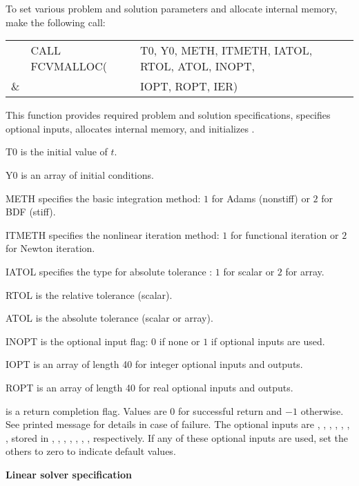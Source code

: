 \begin{Steps}
  To set various problem and solution parameters and allocate
  internal memory, make the following call:
  {
    \begin{tabular}[t]{@{}r@{}l@{}l@{}}
      &CALL FCVMALLOC(&T0, Y0, METH, ITMETH, IATOL, RTOL, ATOL, INOPT, \\
    \&&               &IOPT, ROPT, IER)
    \end{tabular}
  }
  {
    This function provides required problem and solution specifications, 
    specifies optional inputs,
    allocates internal memory, and initializes {\cvode}.
  }
  {
    \begin{args}[ITMETH ]
    \item[T0] is the initial value of $t$.
    \item[Y0] is an array of initial conditions.
    \item[METH] specifies the  basic integration method: 
      $1$ for Adams (nonstiff) or $2$ for BDF (stiff).
    \item[ITMETH] specifies the nonlinear iteration method: 
      $1$ for functional iteration or $2$ for Newton iteration.
    \item[IATOL] specifies the type for absolute tolerance :
      $1$ for scalar or $2$ for array.
    \item[RTOL] is the relative tolerance (scalar).
    \item[ATOL] is the absolute tolerance (scalar or array).
    \item[INOPT] is the optional input flag: $0$ if none or $1$ if optional 
      inputs are used.
    \item[IOPT] is an array of length 40 for integer optional inputs and outputs.
    \item[ROPT] is an array of length 40 for real optional inputs and outputs.
    \end{args}
  }
  {
     is a return completion flag.  Values are $0$ for successful return and 
    $-1$ otherwise. See printed message for details in case of failure.
  }
  {
    The optional inputs are , , , , , 
    , , stored in , , , 
    , , , , respectively.  
    If any of these optional inputs are used, set the others to zero to indicate 
    default values. 
  }

\item\label{i:fcvode_lin_solv_spec} {\bf Linear solver specification} 
  

\end{Steps}
